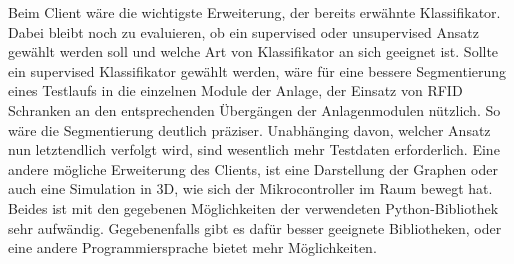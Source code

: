 Beim Client wäre die wichtigste Erweiterung, der bereits erwähnte Klassifikator. Dabei bleibt noch zu evaluieren, ob ein supervised oder unsupervised Ansatz gewählt werden soll und welche Art von Klassifikator an sich geeignet ist. Sollte ein supervised Klassifikator gewählt werden, wäre für eine bessere Segmentierung eines Testlaufs in die einzelnen Module der Anlage, der Einsatz von RFID Schranken an den entsprechenden Übergängen der Anlagenmodulen nützlich. So wäre die Segmentierung deutlich präziser. Unabhänging davon, welcher Ansatz nun letztendlich verfolgt wird, sind wesentlich mehr Testdaten erforderlich.
Eine andere mögliche Erweiterung des Clients, ist eine Darstellung der Graphen oder auch eine Simulation in 3D, wie sich der Mikrocontroller im Raum bewegt hat. Beides ist mit den gegebenen Möglichkeiten der verwendeten Python-Bibliothek sehr aufwändig. Gegebenenfalls gibt es dafür besser geeignete Bibliotheken, oder eine andere Programmiersprache bietet mehr Möglichkeiten.